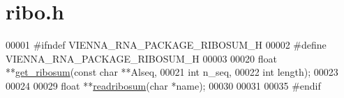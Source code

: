 \hypertarget{ribo_8h_source}{}\section{ribo.\+h}
\label{ribo_8h_source}

\begin{DoxyCode}
00001 \textcolor{preprocessor}{#ifndef VIENNA\_RNA\_PACKAGE\_RIBOSUM\_H}
00002 \textcolor{preprocessor}{#define VIENNA\_RNA\_PACKAGE\_RIBOSUM\_H}
00003 
00020 \textcolor{keywordtype}{float} **\mbox{\hyperlink{group__consensus__fold_ga1116aed4b2dab5252cd23946d47d52c3}{get\_ribosum}}(\textcolor{keyword}{const} \textcolor{keywordtype}{char}  **Alseq,
00021                     \textcolor{keywordtype}{int}         n\_seq,
00022                     \textcolor{keywordtype}{int}         length);
00023 
00024 
00029 \textcolor{keywordtype}{float} **\mbox{\hyperlink{group__file__utils_ga5e125c9586fcd4e2e1559fe76f7289cc}{readribosum}}(\textcolor{keywordtype}{char} *name);
00030 
00031 
00035 \textcolor{preprocessor}{#endif}
\end{DoxyCode}
